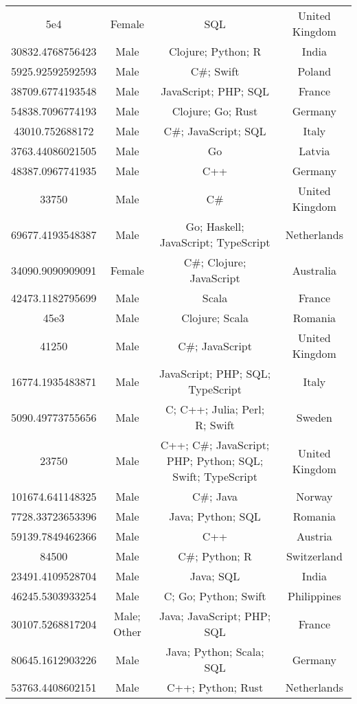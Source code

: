 \begin{center}
\begin{tabular}{ |c|c|c|c| }
5e4  &  Female  &  SQL  &  United Kingdom  \\ 
30832.4768756423  &  Male  &  Clojure; Python; R  &  India  \\ 
5925.92592592593  &  Male  &  C\#; Swift  &  Poland  \\ 
38709.6774193548  &  Male  &  JavaScript; PHP; SQL  &  France  \\ 
54838.7096774193  &  Male  &  Clojure; Go; Rust  &  Germany  \\ 
43010.752688172  &  Male  &  C\#; JavaScript; SQL  &  Italy  \\ 
3763.44086021505  &  Male  &  Go  &  Latvia  \\ 
48387.0967741935  &  Male  &  C++  &  Germany  \\ 
33750  &  Male  &  C\#  &  United Kingdom  \\ 
69677.4193548387  &  Male  &  Go; Haskell; JavaScript; TypeScript  &  Netherlands  \\ 
34090.9090909091  &  Female  &  C\#; Clojure; JavaScript  &  Australia  \\ 
42473.1182795699  &  Male  &  Scala  &  France  \\ 
45e3  &  Male  &  Clojure; Scala  &  Romania  \\ 
41250  &  Male  &  C\#; JavaScript  &  United Kingdom  \\ 
16774.1935483871  &  Male  &  JavaScript; PHP; SQL; TypeScript  &  Italy  \\ 
5090.49773755656  &  Male  &  C; C++; Julia; Perl; R; Swift  &  Sweden  \\ 
23750  &  Male  &  C++; C\#; JavaScript; PHP; Python; SQL; Swift; TypeScript  &  United Kingdom  \\ 
101674.641148325  &  Male  &  C\#; Java  &  Norway  \\ 
7728.33723653396  &  Male  &  Java; Python; SQL  &  Romania  \\ 
59139.7849462366  &  Male  &  C++  &  Austria  \\ 
84500  &  Male  &  C\#; Python; R  &  Switzerland  \\ 
23491.4109528704  &  Male  &  Java; SQL  &  India  \\ 
46245.5303933254  &  Male  &  C; Go; Python; Swift  &  Philippines  \\ 
30107.5268817204  &  Male; Other  &  Java; JavaScript; PHP; SQL  &  France  \\ 
80645.1612903226  &  Male  &  Java; Python; Scala; SQL  &  Germany  \\ 
53763.4408602151  &  Male  &  C++; Python; Rust  &  Netherlands  \\ 

\end{tabular}
\end{center}
